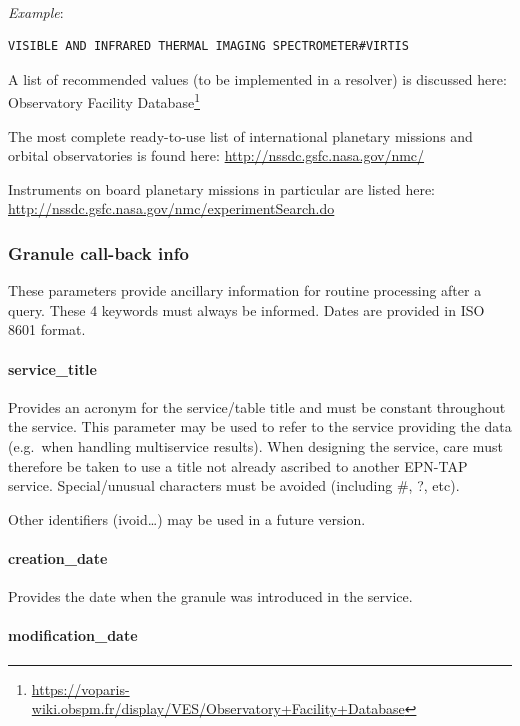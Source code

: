 \documentclass[11pt,a4paper]{ivoa}
\begin{document}
\textbf{\\}
\emph{Example}:

\begin{verbatim}
VISIBLE AND INFRARED THERMAL IMAGING SPECTROMETER#VIRTIS
\end{verbatim}

A list of recommended values (to be implemented in
a resolver) is discussed here: Observatory Facility
Database\footnote{\url{https://voparis-wiki.obspm.fr/display/VES/Observatory+Facility+Database}}

The most complete ready-to-use list of international
planetary missions and orbital observatories is found here:
\url{http://nssdc.gsfc.nasa.gov/nmc/}

Instruments on board planetary missions in particular are listed here:\\
\url{http://nssdc.gsfc.nasa.gov/nmc/experimentSearch.do}

\subsubsection{Granule call-back info}

These parameters provide ancillary information for routine processing
after a query. These 4 keywords must always be informed.
Dates are provided in ISO 8601 format.

\paragraph{service\_title}

Provides an acronym for the service/table title and must be constant
throughout the service. This parameter may be used to refer to the service
providing the data (e.g.\ when handling multiservice results). When
designing the service, care must therefore be taken to use a title not
already ascribed to another EPN-TAP service. Special/unusual characters
must be avoided (including \#, ?, etc).

Other identifiers (ivoid…) may be used in a future version.

\paragraph{creation\_date}

Provides the date when the granule was introduced in the service.

\paragraph{modification\_date}
\end{document}
